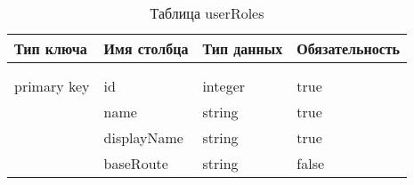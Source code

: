 \begin{xltabular}{\textwidth}{|l|l|p{1.7cm}|X|}
	\caption{Таблица userRoles \label{userRoles:table}}\\ \hline
	\centrow Тип ключа & \centrow Имя столбца & \centrow Тип данных & \centrow Обязательность \\ \hline
	 &  &  &  \\ \hline
	\endfirsthead
	 &  &  &  \\ \hline
	\finishhead
	primary key & id & integer & true \\ \hline
	& name & string & true \\ \hline
	& displayName & string & true \\ \hline
	& baseRoute & string & false \\ \hline
\end{xltabular}


